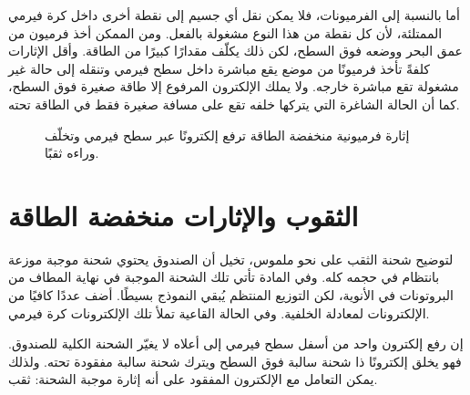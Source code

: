 أما بالنسبة إلى الفرميونات، فلا يمكن نقل أي جسيم إلى نقطة أخرى داخل كرة فيرمي الممتلئة، لأن كل نقطة من هذا النوع مشغولة بالفعل. ومن الممكن أخذ فرميون من عمق البحر ووضعه فوق السطح، لكن ذلك يكلّف مقدارًا كبيرًا من الطاقة. وأقل الإثارات كلفةً تأخذ فرميونًا من موضع يقع مباشرة داخل سطح فيرمي وتنقله إلى حالة غير مشغولة تقع مباشرة خارجه. ولا يملك الإلكترون المرفوع إلا طاقة صغيرة فوق السطح، كما أن الحالة الشاغرة التي يتركها خلفه تقع على مسافة صغيرة فقط في الطاقة تحته.

\begin{figure}
\centering
{}
\caption{إثارة فرميونية منخفضة الطاقة ترفع إلكترونًا عبر سطح فيرمي وتخلّف وراءه ثقبًا.}
\end{figure}

\section{الثقوب والإثارات منخفضة الطاقة}

لتوضيح شحنة الثقب على نحو ملموس، تخيل أن الصندوق يحتوي شحنة موجبة موزعة بانتظام في حجمه كله. وفي المادة تأتي تلك الشحنة الموجبة في نهاية المطاف من البروتونات في الأنوية، لكن التوزيع المنتظم يُبقي النموذج بسيطًا. أضف عددًا كافيًا من الإلكترونات لمعادلة الخلفية. وفي الحالة القاعية تملأ تلك الإلكترونات كرة فيرمي.

إن رفع إلكترون واحد من أسفل سطح فيرمي إلى أعلاه لا يغيّر الشحنة الكلية للصندوق. فهو يخلق إلكترونًا ذا شحنة سالبة فوق السطح ويترك شحنة سالبة مفقودة تحته. ولذلك يمكن التعامل مع الإلكترون المفقود على أنه إثارة موجبة الشحنة: ثقب.

\begin{classroomqa}
\end{classroomqa}

